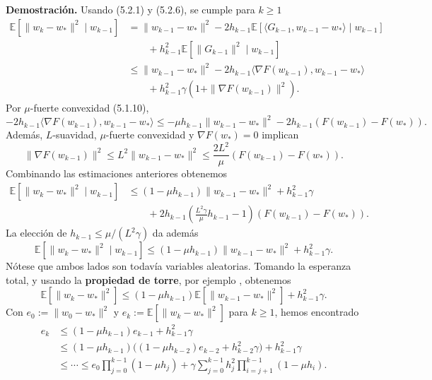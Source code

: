 \documentclass[11pt]{report}
\theoremstyle{definition}
\theoremstyle{plain}
\numberwithin{equation}{section}
\begin{document}
\textbf{Demostración.} Usando (5.2.1) y (5.2.6), se cumple para \(k\geq 1\)
\begin{align*}
    \mathbb{E}[\|w_k-w_*\|^2\mid w_{k-1}]
    &=
    \|w_{k-1}-w_*\|^2
    -
    2h_{k-1}\mathbb{E}[
        \langle G_{k-1},w_{k-1}-w_*\rangle
        \mid w_{k-1}
    ]\\
    &\qquad
    +
    h_{k-1}^2
    \mathbb{E}[\|G_{k-1}\|^2\mid w_{k-1}]\\
    &\leq
    \|w_{k-1}-w_*\|^2
    -
    2h_{k-1}
    \langle\nabla F(w_{k-1}),w_{k-1}-w_*\rangle\\
    &\qquad
    +
    h_{k-1}^2\gamma
    (1+\|\nabla F(w_{k-1})\|^2).
\end{align*}
Por \(\mu\)-fuerte convexidad (5.1.10),
\begin{equation*}
    -2h_{k-1}
    \langle\nabla F(w_{k-1}),w_{k-1}-w_*\rangle
    \leq
    -\mu h_{k-1}\|w_{k-1}-w_*\|^2
    -
    2h_{k-1}(F(w_{k-1})-F(w_*)).
\end{equation*}
Además, \(L\)-suavidad, \(\mu\)-fuerte convexidad y \(\nabla F(w_*)=0\) implican
\begin{equation*}
    \|\nabla F(w_{k-1})\|^2
    \leq
    L^2\|w_{k-1}-w_*\|^2
    \leq
    \frac{2L^2}{\mu}(F(w_{k-1})-F(w_*)).
\end{equation*}
Combinando las estimaciones anteriores obtenemos
\begin{align*}
    \mathbb{E}[\|w_k-w_*\|^2\mid w_{k-1}]
    &\leq
    (1-\mu h_{k-1})\|w_{k-1}-w_*\|^2
    +
    h_{k-1}^2\gamma\\
    &\qquad
    +
    2h_{k-1}
    \left(
        \frac{L^2\gamma}{\mu}h_{k-1}-1
    \right)
    (F(w_{k-1})-F(w_*)).
\end{align*}
La elección de \(h_{k-1}\leq\mu/(L^2\gamma)\) da además
\begin{equation*}
    \mathbb{E}[\|w_k-w_*\|^2\mid w_{k-1}]
    \leq
    (1-\mu h_{k-1})\|w_{k-1}-w_*\|^2
    +
    h_{k-1}^2\gamma.
\end{equation*}
Nótese que ambos lados son todavía variables aleatorias. Tomando la esperanza total, y usando la \textbf{propiedad de torre}, por ejemplo \cite[Satze 8.1.4]{klenke-2014}, obtenemos
\begin{equation*}
    \mathbb{E}[\|w_k-w_*\|^2]
    \leq
    (1-\mu h_{k-1})\mathbb{E}[\|w_{k-1}-w_*\|^2]
    +
    h_{k-1}^2\gamma.
\end{equation*}
Con \(e_0:=\|w_0-w_*\|^2\) y \(e_k:=\mathbb{E}[\|w_k-w_*\|^2]\) para \(k\geq1\), hemos encontrado
\begin{align*}
    e_k
    &\leq
    (1-\mu h_{k-1})e_{k-1}
    +
    h_{k-1}^2\gamma\\
    &\leq
    (1-\mu h_{k-1})
    \bigl((1-\mu h_{k-2})e_{k-2}+h_{k-2}^2\gamma\bigr)
    +
    h_{k-1}^2\gamma\\
    &\leq
    \cdots
    \leq
    e_0\prod_{j=0}^{k-1}(1-\mu h_j)
    +
    \gamma
    \sum_{j=0}^{k-1}
    h_j^2
    \prod_{i=j+1}^{k-1}(1-\mu h_i).
\end{align*}
\end{document}
